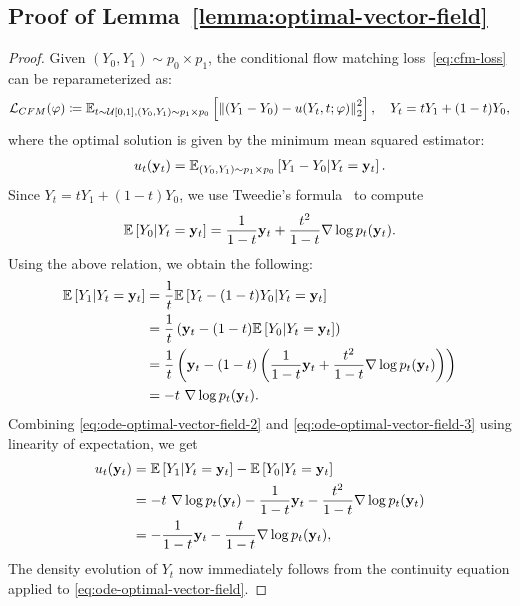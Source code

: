 \documentclass{article} %
\theoremstyle{plain}
\begin{document}
\subsection{Proof of Lemma~\ref{lemma:optimal-vector-field}}
\label{sec:proofs-lemma-optimal-vector-field}
\begin{proof}
Given $(Y_0, Y_1) \sim p_0 \times p_1$, the conditional flow matching loss~\eqref{eq:cfm-loss} can be reparameterized as:
\begin{align*}
    {\mathcal{L}}_{CFM}(\varphi) \coloneqq \mathbb{E}_{t\sim {\mathcal{U}}[0,1],(Y_0,Y_1)\sim p_1 \times p_0}\left[\left\| (Y_1 - Y_0) - u(Y_t,t;\varphi) \right\|_2^2\right],\quad Y_t = t Y_1+(1-t)Y_0,
\end{align*}
where the optimal solution is given by the minimum mean squared estimator:
\begin{align}
    \label{eq:ode-optimal-vector-field-1}
    u_t({\mathbf{y}}_t) = \mathbb{E}_{(Y_0,Y_1)\sim p_1 \times p_0}\left[Y_1 - Y_0 | Y_t={\mathbf{y}}_t\right].
\end{align}
Since $Y_t = tY_1 + (1-t)Y_0$, we use Tweedie's formula~\citep{efron2011tweedie} to compute
\begin{align}
    \label{eq:ode-optimal-vector-field-2}
    \mathbb{E}\left[Y_0 | Y_t={\mathbf{y}}_t\right] = \frac{1}{1-t}{\mathbf{y}}_t + \frac{t^2}{1-t} \nabla \log p_t({\mathbf{y}}_t).
\end{align}
Using the above relation, we obtain the following:
\begin{align}
    \nonumber
    \mathbb{E}\left[Y_1 | Y_t={\mathbf{y}}_t\right] 
    & = \frac{1}{t} \mathbb{E}\left[Y_t - (1-t)Y_0 | Y_t = {\mathbf{y}}_t\right]\\
    \nonumber
    & = \frac{1}{t} \left({\mathbf{y}}_t - (1-t) \mathbb{E}\left[Y_0 | Y_t={\mathbf{y}}_t\right] \right)\\
    \nonumber
    & = \frac{1}{t}\left({\mathbf{y}}_t - (1-t) \left(\frac{1}{1-t}{\mathbf{y}}_t + \frac{t^2}{1-t} \nabla \log p_t({\mathbf{y}}_t) \right) \right)\\
    \label{eq:ode-optimal-vector-field-3}
    & = -t ~\nabla \log p_t({\mathbf{y}}_t).
\end{align}
Combining \eqref{eq:ode-optimal-vector-field-2} and \eqref{eq:ode-optimal-vector-field-3} using linearity of expectation, we get
\begin{align}
    u_t({\mathbf{y}}_t) 
    & = \mathbb{E}\left[Y_1 | Y_t={\mathbf{y}}_t\right] - \mathbb{E}\left[Y_0 | Y_t={\mathbf{y}}_t\right] \\
    & =  -t ~\nabla \log p_t({\mathbf{y}}_t) - \frac{1}{1-t}{\mathbf{y}}_t - \frac{t^2}{1-t} \nabla \log p_t({\mathbf{y}}_t)\\
    & = -\frac{1}{1-t} {\mathbf{y}}_t - \frac{t}{1-t} \nabla \log p_t({\mathbf{y}}_t),
\end{align}
The density evolution of $Y_t$ now immediately follows from the continuity equation \citep{oksendal2003stochastic} applied to \eqref{eq:ode-optimal-vector-field}.
\end{proof}
\end{document}
